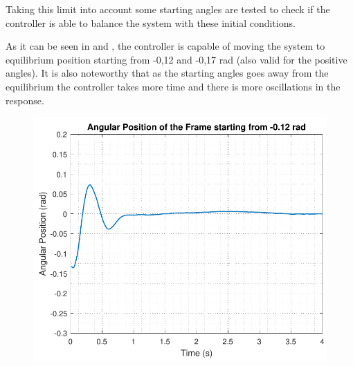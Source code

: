 Taking this limit into account some starting angles are tested to check if the controller is able to balance the system with these initial conditions. 

As it can be seen in  and , the controller is capable of moving the system to equilibrium position starting from -0,12 and -0,17 rad (also valid for the positive angles). It is also noteworthy that as the starting angles goes away from the equilibrium the controller takes more time and there is more oscillations in the response.

\begin{minipage}{\linewidth}
	\begin{minipage}{0.45\linewidth}
		\begin{figure}[H]
			\includegraphics[scale=.55]{figures/testCatch_12}
			\centering
			\captionsetup{justification=centering}
			\label{testCatch_12}
		\end{figure}
	\end{minipage}
	\hspace{0.03\linewidth}
	\begin{minipage}{0.45\linewidth}
		\begin{figure}[H]\vspace{-3mm}

\end{figure}
\end{minipage}
\end{minipage}

